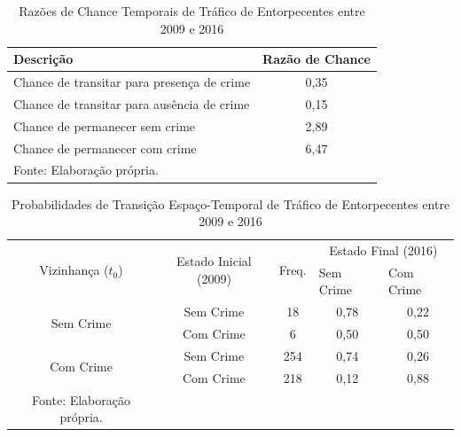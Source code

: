 \documentclass[12pt,openright,oneside,a4paper,english,french,spanish]{abntex2}
\numberwithin{table}{section} %
\numberwithin{figure}{section} %
\begin{document}
\begin{subappendices}
\begin{table}[H]
\centering
\caption{Razões de Chance Temporais de Tráfico de Entorpecentes entre 2009 e 2016}
        \begin{tabular}{lc}
            \hline
            {\textbf{Descrição}} & {\textbf{Razão de Chance}} \\\hline
            {Chance de transitar para presença de crime} & {0,35} \\
            {Chance de transitar para ausência de crime} & {0,15} \\
            {Chance de permanecer sem crime} & {2,89} \\
            {Chance de permanecer com crime} & {6,47} \\\hline
            \tiny Fonte: Elaboração própria.
        \end{tabular}
    \label{tab:odds_tempo_trafico_2009_2016}
\end{table}


\begin{table}[H]
\centering
\caption{Probabilidades de Transição Espaço-Temporal de Tráfico de Entorpecentes entre 2009 e 2016}
        \begin{tabular}{ccccc}
            \hline
            \multirow{2}{*}{Vizinhança ($t_0$)} & \multirow{2}{*}{Estado Inicial (2009)} & \multirow{2}{*}{Freq.} & \multicolumn{2}{c}{Estado Final (2016)}  \\\cline{4-5} %
                                        & & & \multicolumn{1}{l}{Sem Crime} & \multicolumn{1}{l}{Com Crime} \\\hline
            \multirow{2}{*}{Sem Crime} & {Sem Crime} & 18 &  {0,78} & {0,22} \\
                                       & {Com Crime} & 6 &   {0,50} & {0,50} \\\hline
            \multirow{2}{*}{Com Crime} & {Sem Crime} & 254 & {0,74} & {0,26} \\
                                       & {Com Crime} & 218 & {0,12} & {0,88} \\\hline
            \tiny Fonte: Elaboração própria.
        \end{tabular}
    \label{tab:prob_espaco_tempo_trafico_2009_2016}
\end{table}



\end{subappendices}
\end{document}
